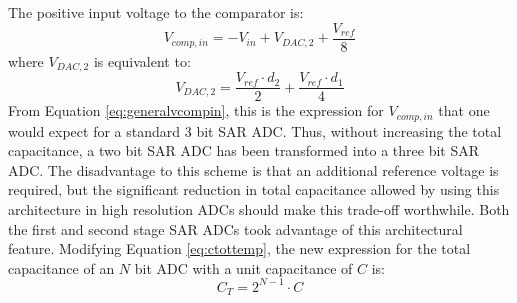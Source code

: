 The positive input voltage to the comparator is:
\begin{equation}
V_{comp,in} = -V_{in} + V_{DAC,2} + \dfrac{V_{ref}}{8}
\end{equation}
where $V_{DAC,2}$ is equivalent to:
\begin{equation}
V_{DAC,2} = \dfrac{V_{ref}\cdot d_{2}}{2} + \dfrac{V_{ref}\cdot d_{1}}{4}
\end{equation}
From Equation \ref{eq:generalvcompin}, this is the expression for $V_{comp,in}$ that one would expect for a standard 3 bit SAR ADC. Thus, without increasing the total capacitance, a two bit SAR ADC has been transformed into a three bit SAR ADC. The disadvantage to this scheme is that an additional reference voltage is required, but the significant reduction in total capacitance allowed by using this architecture in high resolution ADCs should make this trade-off worthwhile. Both the first and second stage SAR ADCs took advantage of this architectural feature. Modifying Equation \ref{eq:ctottemp}, the new expression for the total capacitance of an $N$ bit ADC with a unit capacitance of $C$ is:
\begin{equation}
\label{eq:ctot}
C_{T} = 2^{N-1}\cdot C
\end{equation}